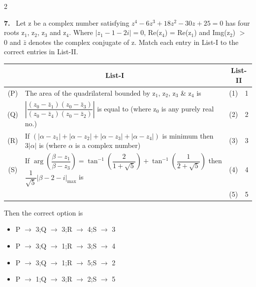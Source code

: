 \documentclass[10pt]{extarticle}
\newcommand{\qn}[1]{\par\smallskip\noindent\textbf{#1.}~}
\newenvironment{qoptions}{\begin{itemize}[leftmargin=1.8em,itemsep=1pt,topsep=2pt,label={}]}{\end{itemize}}
\newcommand{\opt}[2]{\item[(#1)] #2}
\begin{document}
\begin{multicols}{2}
\qn{7} Let z be a complex number satisfying $z^4-6z^3+18z^2-30z+25=0$ has four roots z$_1$, z$_2$, z$_3$ and z$_4$. Where $|z_1-1-2i|=0$, Re(z$_4$) = Re(z$_1$) and Img(z$_2$) $>$ 0 and $\bar z$ denotes the complex conjugate of z. Match each entry in List-I to the correct entries in List-II.
\begin{center}\small\setlength{\tabcolsep}{3pt}
\begin{tabular}{|c|p{3.5cm}|c|p{0.6cm}|}
\hline
\multicolumn{2}{|c|}{List-I} & \multicolumn{2}{c|}{List-II} \\
\hline
(P) & The area of the quadrilateral bounded by z$_1$, z$_2$, z$_3$ \& z$_4$ is & (1) & 1 \\
\hline
(Q) & $\left|\dfrac{(z_0-\bar z_1)(z_0-\bar z_3)}{(z_0-\bar z_4)(z_0-\bar z_2)}\right|$ is equal to (where z$_0$ is any purely real no.) & (2) & 2 \\
\hline
(R) & If $(|\alpha-z_1|+\allowbreak|\alpha-z_2|+\allowbreak|\alpha-z_3|+\allowbreak|\alpha-z_4|)$ is minimum then $3|\alpha|$ is (where $\alpha$ is a complex number) & (3) & 3 \\
\hline
(S) & If $\arg\left(\dfrac{\beta-z_1}{\beta-z_3}\right)=\tan^{-1}\left(\dfrac{2}{1+\sqrt5}\right)+\tan^{-1}\left(\dfrac{1}{2+\sqrt5}\right)$ then $\dfrac{1}{\sqrt5}|\beta-2-i|_{\max}$ is & (4) & 4 \\
\hline
 & & (5) & 5 \\
\hline
\end{tabular}
\end{center}
Then the correct option is
\begin{qoptions}
\opt{A}{P $\to$ 3;Q $\to$ 3;R $\to$ 4;S $\to$ 3}
\opt{B}{P $\to$ 3;Q $\to$ 1;R $\to$ 3;S $\to$ 4}
\opt{C}{P $\to$ 3;Q $\to$ 1;R $\to$ 5;S $\to$ 2}
\opt{D}{P $\to$ 1;Q $\to$ 3;R $\to$ 2;S $\to$ 5}
\end{qoptions}


\end{multicols}
\end{document}
